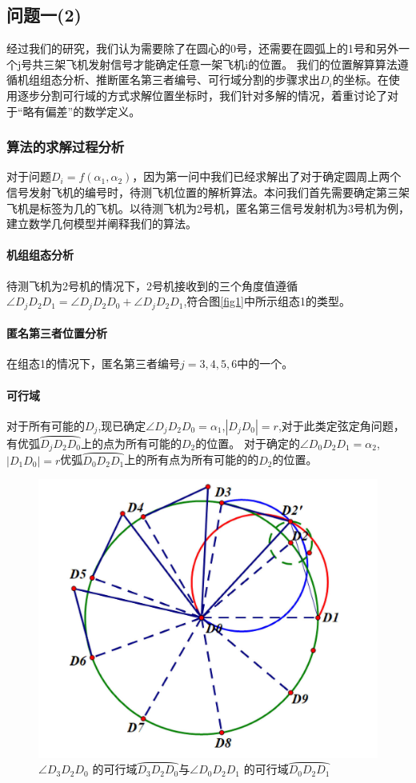 \documentclass[withoutpreface,bwprint]{cumcmthesis} %
\begin{document}
		\subsection{问题一(2)}
			经过我们的研究，我们认为需要除了在圆心的0号，还需要在圆弧上的1号和另外一个j号共三架飞机发射信号才能确定任意一架飞机i的位置。
			我们的位置解算算法遵循机组组态分析、推断匿名第三者编号、可行域分割的步骤求出$D_i$的坐标。在使用逐步分割可行域的方式求解位置坐标时，我们针对多解的情况，着重讨论了对于“略有偏差”的数学定义。
			\subsubsection{算法的求解过程分析}
			对于问题$D_i = f(\alpha_1, \alpha_2)$，因为第一问中我们已经求解出了对于确定圆周上两个信号发射飞机的编号时，待测飞机位置的解析算法。本问我们首先需要确定第三架飞机是标签为几的飞机。以待测飞机为2号机，匿名第三信号发射机为3号机为例，建立数学几何模型并阐释我们的算法。
			\paragraph{机组组态分析}
			待测飞机为2号机的情况下，2号机接收到的三个角度值遵循$\angle D_jD_2D_1 =\angle D_jD_2D_0 + \angle D_jD_2D_1$,符合图\ref{fig1}中所示组态1的类型。
			\paragraph{匿名第三者位置分析}
			在组态1的情况下，匿名第三者编号$j=3,4,5,6$中的一个。
			\paragraph{可行域}
			对于所有可能的$D_j$,现已确定$\angle D_jD_2D_0 = \alpha_1$,$|D_jD_0|= r$,对于此类定弦定角问题，有优弧$\wideparen{D_jD_2D_0}$上的点为所有可能的$D_2$的位置。
			对于确定的$\angle D_0D_2D_1 = \alpha_2$,$|D_1D_0|= r$优弧$\wideparen{D_0D_2D_1}$上的所有点为所有可能的的$D_2$的位置。
			\begin{figure}[htb]
				\centering
				\includegraphics[width=0.4\linewidth]{./figures/3}
				\caption{$\angle D_3D_2D_0$ 的可行域$\wideparen{D_3D_2D_0}$与$\angle D_0D_2D_1$ 的可行域$\wideparen{D_0D_2D_1}$}
				\label{fig3}
			\end{figure}
		
\end{document}

